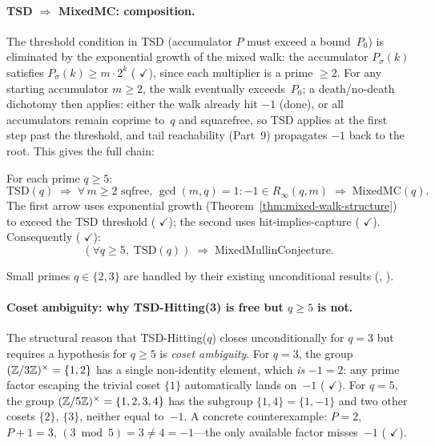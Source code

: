 \paragraph{TSD $\Rightarrow$ MixedMC: composition.}
The threshold condition in TSD (accumulator $P$ must exceed
a bound~$P_0$) is eliminated by the exponential growth of the mixed
walk: the accumulator $P_\sigma(k)$ satisfies
$P_\sigma(k) \geq m \cdot 2^k$
(
{\color{leanink}$\checkmark$}),
since each multiplier is a prime $\geq 2$.  For any starting
accumulator $m \geq 2$, the walk eventually exceeds~$P_0$; a
death/no-death dichotomy then applies: either the walk already hit
$-1$ (done), or all accumulators remain coprime to~$q$ and
squarefree, so TSD applies at the first step past the threshold, and
tail reachability (Part~9) propagates $-1$ back to the root.  This
gives the full chain:

\begin{theorem}
\label{thm:tsd-chain}
For each prime $q \geq 5$:
\[
  \mathrm{TSD}(q)
  \;\Longrightarrow\;
  \forall\, m \geq 2 \text{ sqfree, } \gcd(m,q)=1 \colon
  {-}1 \in R_\infty(q, m)
  \;\Longrightarrow\;
  \mathrm{MixedMC}(q).
\]
The first arrow uses exponential growth
(Theorem~\textup{\ref{thm:mixed-walk-structure}})
to exceed the TSD threshold
(
{\color{leanink}$\checkmark$});
the second uses hit-implies-capture
(
{\color{leanink}$\checkmark$}).
Consequently
(
{\color{leanink}$\checkmark$}):
\[
  (\forall q \geq 5,\; \mathrm{TSD}(q))
  \;\Longrightarrow\; \mathrm{MixedMullinConjecture}.
\]
\end{theorem}

\noindent Small primes $q \in \{2, 3\}$ are handled by their existing
unconditional results (, ).

\paragraph{Coset ambiguity: why TSD-Hitting(3) is free but $q \geq 5$ is not.}
The structural reason that TSD-Hitting($q$) closes unconditionally
for $q = 3$ but requires a hypothesis for $q \geq 5$ is \emph{coset
ambiguity}.  For $q = 3$, the group $(\mathbb{Z}/3\mathbb{Z})^\times = \{1, 2\}$
has a single non-identity element, which \emph{is} $-1 = 2$: any
prime factor escaping the trivial coset $\{1\}$ automatically
lands on~$-1$
(
{\color{leanink}$\checkmark$}).
For $q = 5$, the group $(\mathbb{Z}/5\mathbb{Z})^\times = \{1,2,3,4\}$ has the
subgroup $\{1, 4\} = \{1, -1\}$ and two other cosets $\{2\}$, $\{3\}$,
neither equal to~$-1$.  A concrete counterexample:
$P = 2$, $P{+}1 = 3$, $(3 \bmod 5) = 3 \neq 4 = -1$---the only
available factor misses~$-1$
(
{\color{leanink}$\checkmark$}).

